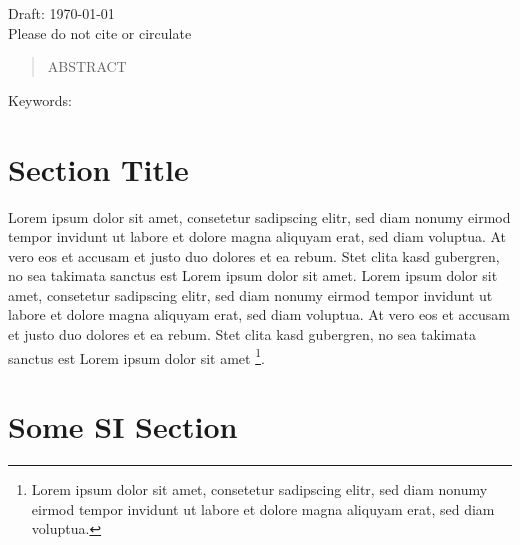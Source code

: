 \documentclass{iheid}
\author{
\myauthor$^{1,\ast}$, Second Author$^{1}$
}
\date{} %
\begin{document}
\begin{titlepage}
\maketitle %

\begin{center}
Draft: \today\\
Please do not cite or circulate
\end{center}

\begin{abstract}
ABSTRACT
\end{abstract}

\begin{center}
{Keywords: \it \mykeywords}
\end{center}

\thispagestyle{firstpages} %
\end{titlepage} 

\restoregeometry %
\setcounter{page}{1} %
\clearpage %

\section{Section Title}\label{sec:intro}
Lorem ipsum dolor sit amet, consetetur sadipscing elitr, sed diam nonumy eirmod tempor invidunt ut labore et dolore magna aliquyam erat, sed diam voluptua. At vero eos et accusam et justo duo dolores et ea rebum. Stet clita kasd gubergren, no sea takimata sanctus est Lorem ipsum dolor sit amet. Lorem ipsum dolor sit amet, consetetur sadipscing elitr, sed diam nonumy eirmod tempor invidunt ut labore et dolore magna aliquyam erat, sed diam voluptua. At vero eos et accusam et justo duo dolores et ea rebum. Stet clita kasd gubergren, no sea takimata sanctus est Lorem ipsum dolor sit amet
\footnote{
Lorem ipsum dolor sit amet, consetetur sadipscing elitr, sed diam nonumy eirmod tempor invidunt ut labore et dolore magna aliquyam erat, sed diam voluptua.
}.

\printbibliography 

\appendix

\section{Some SI Section}\label{app:LABEL}

\end{document}
